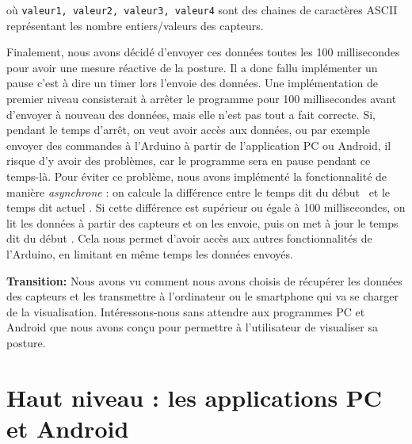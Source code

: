 \documentclass{polytech/polytech}
\begin{document}
où \texttt{valeur1, valeur2, valeur3, valeur4} sont des chaines de caractères ASCII représentant les nombre entiers/valeurs des capteurs. 

Finalement, nous avons décidé d'envoyer ces données toutes les 100 millisecondes pour avoir une mesure réactive de la posture. Il a donc fallu implémenter un pause c'est à dire un \guillemotleft timer \guillemotright  lors l'envoie des données.
 Une implémentation de premier niveau consisterait à arrêter le programme pour 100 millisecondes avant d'envoyer à nouveau des données, mais elle n'est pas tout a fait correcte.
  Si, pendant le temps d'arrêt, on veut avoir accès aux données, ou par exemple envoyer des commandes à l'Arduino à partir de l'application PC ou Android, il risque d'y avoir des problèmes, car le programme sera en pause pendant ce temps-là.
   Pour éviter ce problème, nous avons implémenté la fonctionnalité de manière \textit{asynchrone} : on calcule la différence entre le temps dit \guillemotleft du début \guillemotright\ et le temps dit \guillemotleft actuel \guillemotright . 
   Si cette différence est supérieur ou égale à 100 millisecondes, on lit les données à partir des capteurs et on les envoie, puis on met à jour le temps dit \guillemotleft du début \guillemotright . 
   Cela nous permet d'avoir accès aux autres fonctionnalités de l'Arduino, en limitant en même temps les données envoyés.


\textbf{Transition:} Nous avons vu comment nous avons choisis de récupérer les données des capteurs et les transmettre à l'ordinateur ou le smartphone qui va se charger de la visualisation. Intéressons-nous sans attendre aux programmes PC et Android que nous avons conçu pour permettre à l'utilisateur de visualiser sa posture.

\section{Haut niveau : les applications PC et Android}
\end{document}
